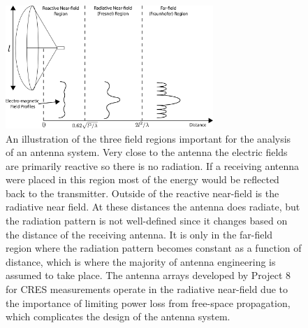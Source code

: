 \begin{figure}[htbp]
    \centering
    \includegraphics[width=0.7\textwidth]{figs/Chapter-5/230421_field_regions.png}
    \caption{An illustration of the three field regions important for the analysis of an antenna system. Very close to the antenna the electric fields are primarily reactive so there is no radiation. If a receiving antenna were placed in this region most of the energy would be reflected back to the transmitter. Outside of the reactive near-field is the radiative near field. At these distances the antenna does radiate, but the radiation pattern is not well-defined since it changes based on the distance of the receiving antenna. It is only in the far-field region where the radiation pattern becomes constant as a function of distance, which is where the majority of antenna engineering is assumed to take place. The antenna arrays developed by Project 8 for CRES measurements operate in the radiative near-field due to the importance of limiting power loss from free-space propagation, which complicates the design of the antenna system.}
    \label{fig:field-regions}
\end{figure}

